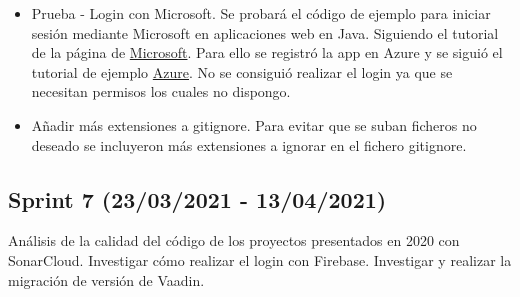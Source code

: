\begin{itemize}
	\item Prueba - Login con Microsoft.
	Se probará el código de ejemplo para iniciar sesión mediante Microsoft en aplicaciones web en Java. Siguiendo el tutorial de la página de \href{https://docs.microsoft.com/en-us/azure/active-directory/develop/quickstart-v2-java-webapp}{Microsoft}. Para ello se registró la app en Azure y se siguió el tutorial de ejemplo \href{https://portal.azure.com/#blade/Microsoft_AAD_RegisteredApps/ApplicationsListBlade/quickStartType/JavaQuickstartPage/sourceType/docs}{Azure}. No se consiguió realizar el login ya que se necesitan permisos los cuales no dispongo.
	\item Añadir más extensiones a gitignore. 
	Para evitar que se suban ficheros no deseado se incluyeron más extensiones a ignorar en el fichero gitignore. 
	
\end{itemize}

\subsection{Sprint 7 (23/03/2021 - 13/04/2021)}
Análisis de la calidad del código de los proyectos presentados en 2020 con SonarCloud. Investigar cómo realizar el login con Firebase. Investigar y realizar la migración de versión de Vaadin.

